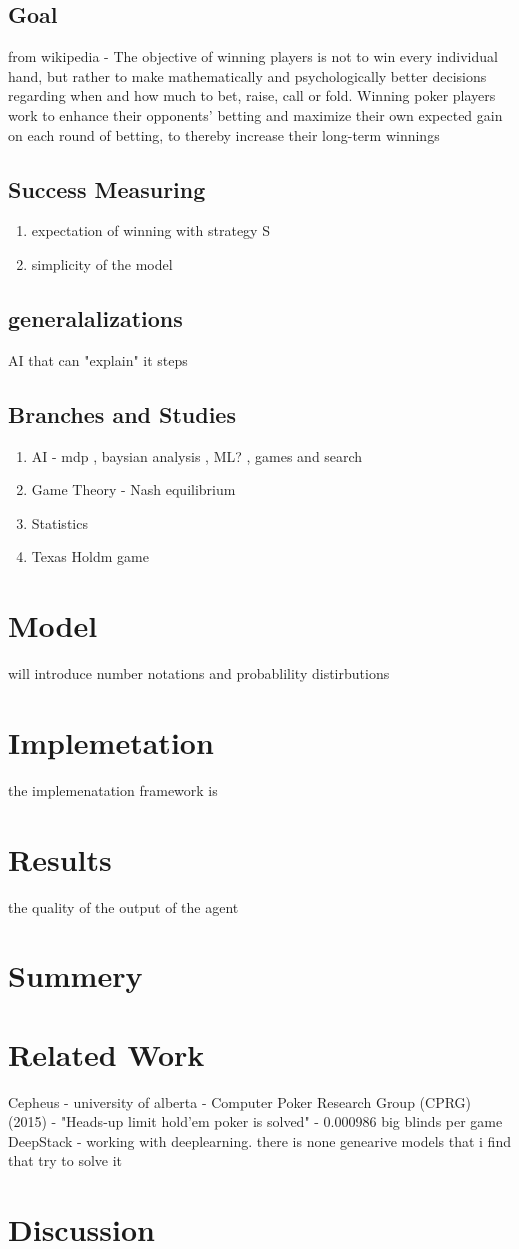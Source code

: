 \documentclass{article}
\begin{document}
\subsection{Goal}
from wikipedia - The objective of winning players is not to win every individual hand, but rather to make mathematically and psychologically better decisions regarding when and how much to bet, raise, call or fold. Winning poker players work to enhance their opponents' betting and maximize their own expected gain on each round of betting, to thereby increase their long-term winnings
\subsection{Success Measuring}
\begin{enumerate}
\item expectation of winning with strategy S
\item simplicity of the model
\end{enumerate}
\subsection{generalalizations}
AI that can "explain" it steps
\subsection{Branches and Studies}
\begin{enumerate}
  \item AI - mdp , baysian analysis , ML? , games and search
   \item Game Theory - Nash equilibrium
   \item Statistics
   \item  Texas Holdm game
\end{enumerate}
\section{Model}
will introduce number notations and probablility distirbutions
\section{Implemetation}
the implemenatation framework is
\section{Results}
the quality of the output of the agent
\section{Summery}
\section{Related Work}
Cepheus   - university of alberta -  Computer Poker Research Group (CPRG) (2015) - "Heads-up limit hold’em poker is solved" - 0.000986 big blinds per game \\
DeepStack - working with deeplearning.
there is none genearive models that i find that try to solve it
\section{Discussion}
\end{document}
